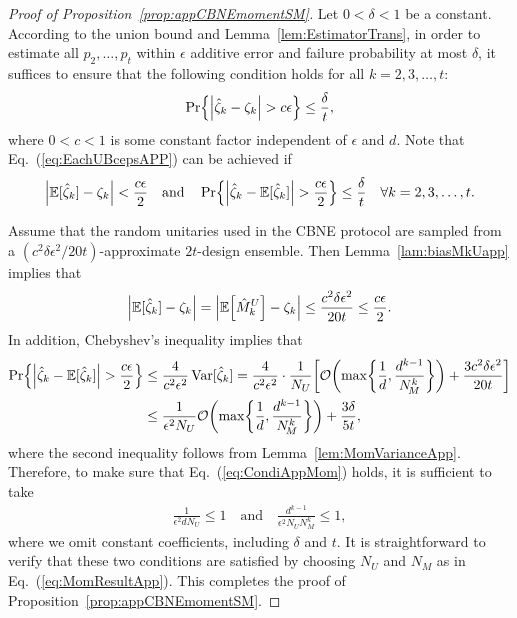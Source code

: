 \documentclass[aps,prl,twocolumn,nofootinbib,superscriptaddress,10pt]{revtex4-2}
\let\originalleft\left
\let\originalright\right
\renewcommand{\left}{\mathopen{}\mathclose\bgroup\originalleft}
\renewcommand{\right}{\aftergroup\egroup\originalright}
\def\E{ {\mathbb E} } %
\DeclareMathOperator{\Var}{Var}
\newcommand{\bigo}[1]{\mathcal{O}\left(#1\right)}
\theoremstyle{plain}
\theoremstyle{definition}
\newcommand{\eref}[1]{Eq.~\textup{(\ref{#1})}}
\newcommand{\lref}[1]{Lemma~\ref{#1}}
\newcommand{\pref}[1]{Proposition~\ref{#1}}
\begin{document}
\begin{proof}[Proof of \pref{prop:appCBNEmomentSM}]
Let $0<\delta<1$ be a constant. 
According to the union bound and \lref{lem:EstimatorTrans}, in order to estimate all 
$p_2,\dots,p_t$ within $\epsilon$ additive error and failure probability at most $\delta$, it 
suffices to ensure that the following condition holds for all $k=2,3,\dots,t$: 
\begin{equation}\label{eq:EachUBcepsAPP}
	\Pr\left\{ \left|\hat\zeta_k-\zeta_k\right| > c\epsilon \right\} \leq \frac{\delta}{t},
\end{equation}
where $0<c<1$ is some constant factor independent of $\epsilon$ and $d$.  
Note that \eref{eq:EachUBcepsAPP} can be achieved if 
\begin{align}\label{eq:CondiAppMom}
\left|\E[\hat\zeta_k]-\zeta_k\right| < \frac{c\epsilon}{2} 
\quad\text{and}\quad
\Pr\left\{ \left|\hat\zeta_k-\E[\hat\zeta_k]\right| > \frac{c\epsilon}{2}  \right\} \leq \frac{\delta}{t} \quad \forall k=2,3,\dots,t. 
\end{align} 

Assume that the random unitaries used in the CBNE protocol are sampled from a %
$(c^2\delta\epsilon^2/20t)$-approximate $2t$-design ensemble. 
Then \lref{lam:biasMkUapp} implies that
\begin{align}
 \left|\E[\hat\zeta_k]-\zeta_k\right| 
=\Big|\E\left[ \hat M^U_k\right] -\zeta_k\Big| 
\leq \frac{c^2\delta \epsilon^2}{20 t}
\leq \frac{c\epsilon}{2}. 
\end{align} 
In addition, Chebyshev's inequality implies that 
\begin{align}\label{eq:ChebyY}
\Pr\left\{ \left|\hat\zeta_k-\E[\hat\zeta_k]\right| > \frac{c\epsilon}{2}  \right\} 
&\leq \frac{4}{c^2\epsilon^2}\Var[\hat\zeta_k]  
= \frac{4}{c^2\epsilon^2} \cdot \frac{1}{N_U} 
\left[ \bigo{\max\left\lbrace \frac{1}{d} ,\frac{d^{k-1}}{N_{\!M}^{k}} \right\rbrace } 
       + \frac{3c^2\delta \epsilon^2}{20 t} \right] 
\nonumber\\
&\leq\frac{1}{\epsilon^2 N_U} \bigo{\max\left\lbrace \frac{1}{d} ,\frac{d^{k-1}}{N_{\!M}^{k}} \right\rbrace } 
     + \frac{3\delta}{ 5t }, 
\end{align} 
where the second inequality follows from \lref{lem:MomVarianceApp}. 
Therefore, to make sure that \eref{eq:CondiAppMom} holds, it is sufficient to take 
\begin{align} 
\frac{1}{\epsilon^2 dN_U} \leq 1
\quad\text{and}\quad  
\frac{d^{k-1}}{\epsilon^2  N_U N_{\!M}^{k}} \leq 1 , 
\end{align}
where we omit constant coefficients, including $\delta$ and $t$. 
It is straightforward to verify that these two conditions are satisfied by choosing $N_U$ and $N_M$ as in \eref{eq:MomResultApp}. 
This completes the proof of \pref{prop:appCBNEmomentSM}. 
\end{proof}
\end{document}
